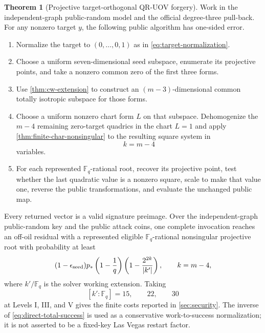 \documentclass[11pt,a4paper]{article}
\theoremstyle{definition}
\newtheorem{theorem}{Theorem}[section]
\theoremstyle{remark}
\newcommand{\F}{\mathbb F}
\begin{document}
\begin{theorem}[Projective target-orthogonal QR-UOV forgery]\label{thm:verified-direct-forgery}
Work in the independent-graph public-random model and the official degree-three
pull-back.  For any nonzero target $y$, the following public algorithm has
one-sided error.
\begin{enumerate}
\item Normalize the target to $(0,\ldots,0,1)$ as in
\eqref{eq:target-normalization}.
\item Choose a uniform seven-dimensional seed subspace, enumerate its
projective points, and take a nonzero common zero of the first three forms.
\item Use \cref{thm:cw-extension} to construct an $(m-3)$-dimensional common
totally isotropic subspace for those forms.
\item Choose a uniform nonzero chart form $L$ on that subspace.  Dehomogenize
the $m-4$ remaining zero-target quadrics in the chart $L=1$ and apply
\cref{thm:finite-char-nonsingular} to the resulting square system in
\[
 k=m-4
\]
variables.
\item For each represented $\F_q$-rational root, recover its projective point,
test whether the last quadratic value is a nonzero square, scale to make that
value one, reverse the public transformations, and evaluate the unchanged
public map.
\end{enumerate}
Every returned vector is a valid signature preimage.  Over the
independent-graph public-random key and the public attack coins, one complete
invocation reaches an off-oil residual with a represented eligible
$\F_q$-rational nonsingular projective root with probability at least
\begin{equation}\label{eq:direct-total-success}
 (1-\epsilon_{\rm seed})p_*
 \left(1-\frac1q\right)
 \left(1-\frac{2^{2k}}{|k'|}\right),
 \qquad k=m-4,
\end{equation}
where $k'/\F_q$ is the solver working extension.  Taking
\[
 [k':\F_q]=15,\qquad22,\qquad30
\]
at Levels I, III, and V gives the finite costs reported in
\cref{sec:security}.  The inverse of \eqref{eq:direct-total-success} is used as
a conservative work-to-success normalization; it is not asserted to be a
fixed-key Las Vegas restart factor.
\end{theorem}
\end{document}
